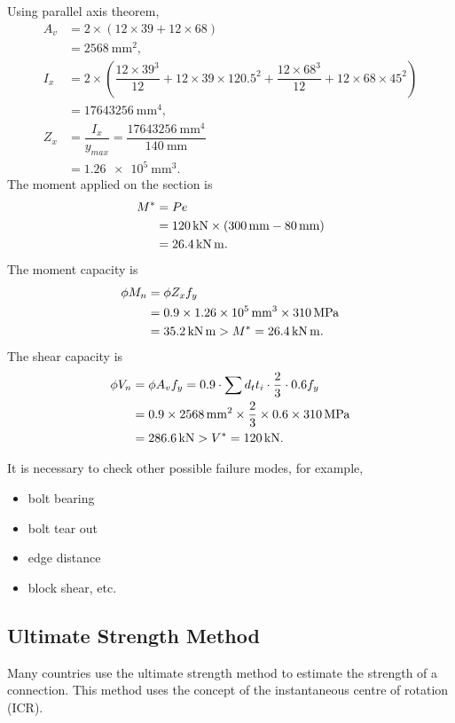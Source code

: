 \begin{solution}
\begin{figure}[H]

\end{figure}
Using parallel axis theorem,
\begin{align*}
A_v&=2\times\left(12\times39+12\times68\right)\\
&=\SI{2568}{\mm^2},\\
I_x&=2\times\left(\dfrac{12\times39^3}{12}+12\times39\times120.5^2+\dfrac{12\times68^3}{12}+12\times68\times45^2\right)\\
&=\SI{17643256}{\mm^4},\\
Z_x&=\dfrac{I_x}{y_{max}}=\dfrac{\SI{17643256}{\mm^4}}{\SI{140}{\mm}}\\&=\SI{1.26e5}{\mm^3}.
\end{align*}
The moment applied on the section is
\begin{align*}
M^*&=Pe\\&=\SI{120}{\kilo\newton}\times\left(\SI{300}{\milli\meter}-\SI{80}{\milli\meter}\right)\\&=\SI{26.4}{\kilo\newton\meter}.
\end{align*}
The moment capacity is
\begin{align*}
\phi{}M_n&=\phi{}Z_xf_y\\&=0.9\times\SI{1.26e5}{\milli\meter^3}\times\SI{310}{\mega\pascal}\\&=\SI{35.2}{\kilo\newton\meter}>M^*=\SI{26.4}{\kilo\newton\meter}.
\end{align*}
The shear capacity is
\begin{align*}
\phi{}V_n&=\phi{}A_vf_y=0.9\cdot\sum{}d_tt_i\cdot\dfrac{2}{3}\cdot0.6f_y\\
&=0.9\times\SI{2568}{\milli\meter^2}\times\dfrac{2}{3}\times0.6\times\SI{310}{\mega\pascal}\\
&=\SI{286.6}{\kilo\newton}>V^*=\SI{120}{\kilo\newton}.
\end{align*}

It is necessary to check other possible failure modes, for example,
\begin{itemize}
\item bolt bearing
\item bolt tear out
\item edge distance
\item block shear, etc.
\end{itemize}
\end{solution}
\subsection{Ultimate Strength Method}
Many countries use the ultimate strength method to estimate the strength of a connection. This method uses the concept of the instantaneous centre of rotation (ICR).
\begin{figure}[H]
\centering
\end{figure}

